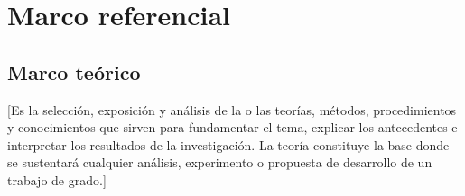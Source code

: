 \chapter{Marco referencial}



\section{Marco teórico}

[Es la selección, exposición y análisis de la o las teorías, métodos, procedimientos y conocimientos que sirven para fundamentar el tema, explicar los antecedentes e interpretar los resultados de la investigación. La teoría constituye la base donde se sustentará cualquier análisis, experimento o propuesta de desarrollo de un trabajo de grado.]















